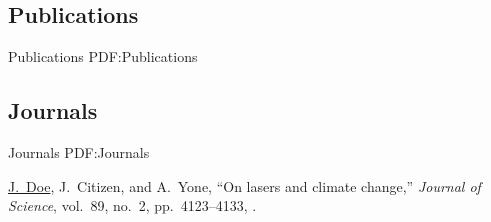 \documentclass[letterpaper,10pt,oneside]{article}
\begin{document}
\begin{body}


\BigGap









\section
{Publications}
{Publications}
{PDF:Publications}

\iffalse
\subsection
{Journals}
{Journals}
{PDF:Journals}

\GapNoBreak
\NumberedItem{[11]}
{\underline{J.~Doe}, J.~Citizen, and A.~Yone,
``On lasers and climate change,''
\textit{Journal of Science},
vol.~89,
no.~2,
pp.~4123--4133,
.}


\end{body}
\end{document}
